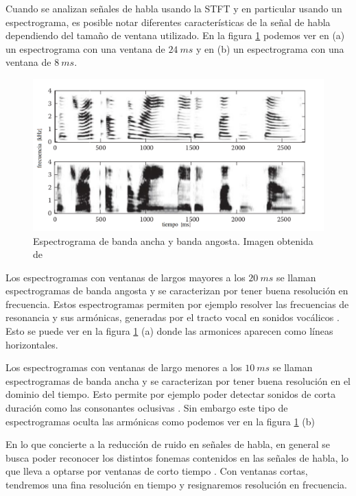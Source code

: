 Cuando se analizan señales de habla usando la STFT y en particular usando un espectrograma, es posible notar diferentes características de la señal de habla dependiendo del tamaño de ventana utilizado. En la figura \ref{fig:ch2_wideband_narrowband} podemos ver en (a) un espectrograma con una ventana de $\SI{24}{ms}$ y en (b) un espectrograma con una ventana de $\SI{8}{ms}$. 

\begin{figure}[H]
	\centering
	\centerline{\includegraphics[scale=0.4]{images/ch2/wideband_narrowband.png}}
	\caption{Espectrograma de banda ancha y banda angosta. Imagen obtenida de \cite{speech_enhancement_theory_and_practice}}
	\label{fig:ch2_wideband_narrowband}
\end{figure}

Los espectrogramas con ventanas de largos mayores a los $\SI{20}{ms}$ se llaman espectrogramas de banda angosta y se caracterizan por tener buena resolución en frecuencia. Estos espectrogramas permiten por ejemplo resolver las frecuencias de resonancia y sus armónicas, generadas por el tracto vocal en sonidos vocálicos \cite{spoken_language_processing}. Esto se puede ver en la figura \ref{fig:ch2_wideband_narrowband} (a) donde las armonices aparecen como líneas horizontales.

Los espectrogramas con ventanas de largo menores a los $\SI{10}{ms}$ se llaman espectrogramas de banda ancha y se caracterizan por tener buena resolución en el dominio del tiempo. Esto permite por ejemplo poder detectar sonidos de corta duración como las consonantes oclusivas \cite{spoken_language_processing}. Sin embargo este tipo de espectrogramas oculta las armónicas como podemos ver en la figura \ref{fig:ch2_wideband_narrowband} (b) 

En lo que concierte a la reducción de ruido en señales de habla, en general se busca poder reconocer los distintos fonemas contenidos en las señales de habla, lo que lleva a optarse por ventanas de corto tiempo \cite{speech_enhancement_theory_and_practice}. Con ventanas cortas, tendremos una fina resolución en tiempo y resignaremos resolución en frecuencia.


